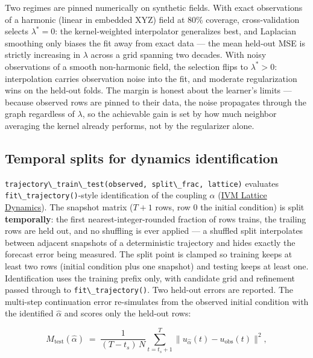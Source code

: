 \documentclass[
  10pt,
]{article}
\newcommand{\passthrough}[1]{#1}
\begin{document}
Two regimes are pinned numerically on synthetic fields. With exact
observations of a harmonic (linear in embedded XYZ) field at 80\%
coverage, cross-validation selects \(\lambda^{*} = 0\): the
kernel-weighted interpolator generalizes best, and Laplacian smoothing
only biases the fit away from exact data --- the mean held-out MSE is
strictly increasing in \(\lambda\) across a grid spanning two decades.
With noisy observations of a smooth non-harmonic field, the selection
flips to \(\lambda^{*} > 0\): interpolation carries observation noise
into the fit, and moderate regularization wins on the held-out folds.
The margin is honest about the learner's limits --- because observed
rows are pinned to their data, the noise propagates through the graph
regardless of \(\lambda\), so the achievable gain is set by how much
neighbor averaging the kernel already performs, not by the regularizer
alone.

\subsection{Temporal splits for dynamics
identification}\label{temporal-splits-for-dynamics-identification}

\passthrough{\lstinline!trajectory\_train\_test(observed, split\_frac, lattice)!}
evaluates \passthrough{\lstinline!fit\_trajectory()!}-style
identification of the coupling \(\alpha\) (\href{12_ivm_dynamics.md}{IVM
Lattice Dynamics}). The snapshot matrix (\(T+1\) rows, row 0 the initial
condition) is split \textbf{temporally}: the first
nearest-integer-rounded fraction of rows trains, the trailing rows are
held out, and no shuffling is ever applied --- a shuffled split
interpolates between adjacent snapshots of a deterministic trajectory
and hides exactly the forecast error being measured. The split point is
clamped so training keeps at least two rows (initial condition plus one
snapshot) and testing keeps at least one. Identification uses the
training prefix only, with candidate grid and refinement passed through
to \passthrough{\lstinline!fit\_trajectory()!}. Two held-out errors are
reported. The multi-step continuation error re-simulates from the
observed initial condition with the identified \(\hat{\alpha}\) and
scores only the held-out rows:

\begin{equation}
\label{eq:learn-horizon}
M_{\mathrm{test}}(\hat{\alpha}) \;=\; \frac{1}{(T - t_s)\,N}
\sum_{t=t_s+1}^{T} \big\lVert u_{\hat{\alpha}}(t) - u_{\mathrm{obs}}(t)
\big\rVert^{2} ,
\end{equation}
\end{document}
